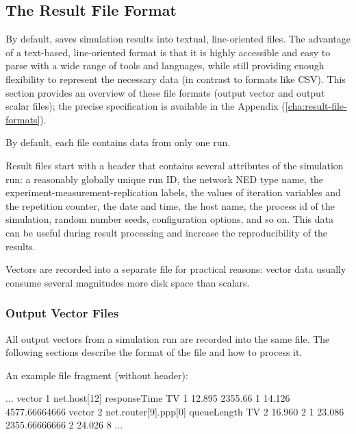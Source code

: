 \subsection{The {\opp} Result File Format}
\label{sec:ana-sim:omnetpp-result-file-format}

By default, {\opp} saves simulation results into textual, line-oriented files.
The advantage of a text-based, line-oriented format is that it is highly
accessible and easy to parse with a wide range of tools and languages, while
still providing enough flexibility to represent the necessary data (in contrast
to formats like CSV). This section provides an overview of these file formats
(output vector and output scalar files); the precise specification is available
in the Appendix (\ref{cha:result-file-formats}).


By default, each file contains data from only one run.

Result files start with a header that contains several attributes of the
simulation run: a reasonably globally unique run ID, the network NED type
name, the experiment-measurement-replication labels, the values of
iteration variables and the repetition counter, the date and time, the host
name, the process id of the simulation, random number seeds, configuration
options, and so on. This data can be useful during result processing and
increase the reproducibility of the results.


Vectors are recorded into a separate file for practical reasons: vector
data usually consume several magnitudes more disk space than scalars.


\subsubsection{Output Vector Files}
\label{sec:ana-sim:output-vector-files}

All output vectors from a simulation run are recorded into the same file.
The following sections describe the format of the file and
how to process it.

An example file fragment (without header):

\begin{filelisting}
...
vector 1   net.host[12]  responseTime  TV
1  12.895  2355.66
1  14.126  4577.66664666
vector 2   net.router[9].ppp[0] queueLength  TV
2  16.960  2
1  23.086  2355.66666666
2  24.026  8
...
\end{filelisting}

